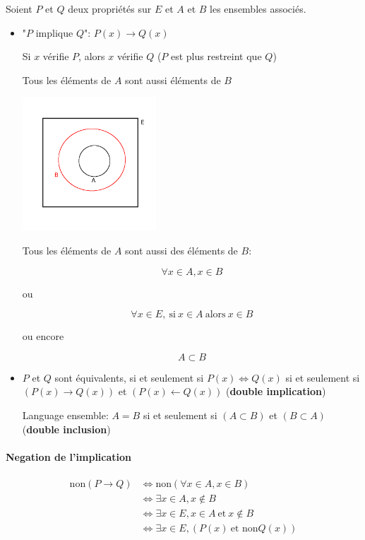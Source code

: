 \documentclass[
    11pt,
    a4paper,
    oneside,
    headinlcude, footinclude,
    twoside,
]{report}
\newcommand{\myImplies}[0]{\rightarrow}
\begin{document}
Soient $P$ et $Q$ deux propriétés sur $E$ et $A$ et $B$ les ensembles associés.

\begin{itemize}
    \item "$P$ implique $Q$": $P(x) \myImplies Q(x)$

        Si $x$ vérifie $P$, alors $x$ vérifie $Q$ ($P$ est plus restreint que
        $Q$)

        Tous les éléments de $A$ sont aussi éléments de $B$

        \begin{center}
            \includegraphics[width=5cm]{fig5}
        \end{center}

        Tous les éléments de $A$ sont aussi des éléments de $B$:

        $$\forall x \in A, x \in B$$

        ou

        $$\forall x \in E, \ \textrm{si}\ x \in A \ \textrm{alors}\ x \in B $$

        ou encore

        $$A \subset B$$

    \item $P$ et $Q$ sont équivalents, si et seulement si $P(x) \iff Q(x)$ si
        et seulement si $(P(x) \myImplies Q(x))$ et $(P(x) \leftarrow Q(x))$
        (\textbf{double implication}) 

        Language ensemble: $A = B$ si et seulement si $(A \subset B)$ et $(B \subset A)$
        (\textbf{double inclusion})
\end{itemize}


\paragraph{Negation de l'implication}
\label{par:negation_de_l_implication}

\[
    \begin{split}
        \textrm{non} (P \myImplies Q) & \iff \textrm{non} (\forall x \in A, x \in B)\\
        & \iff \exists x \in A, x \notin B\\
        & \iff \exists x \in E, x \in A \ \textrm{et}\ x \notin B\\
        & \iff \exists x \in E, (P(x) \ \textrm{et non}Q(x))
    \end{split}
\]
\end{document}
